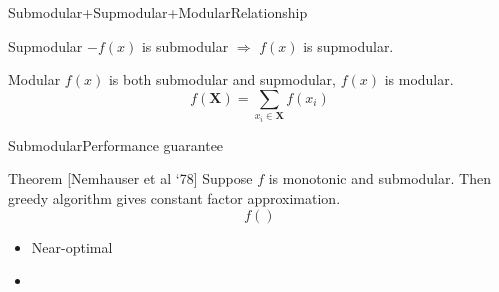 \begin{frame}{Submodular+Supmodular+Modular}{Relationship}
\begin{block}{Supmodular}
$ - f(x) $ is submodular $ \Rightarrow $ $ f(x) $ is supmodular.
\end{block}
\begin{block}{Modular}
$ f(x) $ is both submodular and supmodular, $ f(x) $ is modular.
\begin{equation}
\nonumber
f( \mathbf{X} ) = \sum_{ x_{i} \in \mathbf{X} } f(x_{i})
\end{equation}
\end{block}
\end{frame}

\begin{frame}{Submodular}{Performance guarantee}
\begin{block}{Theorem [Nemhauser et al `78]}
Suppose $ f $ is monotonic and submodular. 
Then greedy algorithm gives constant factor approximation.
\begin{equation}
\nonumber
f()
\end{equation}	
\end{block}
\begin{itemize}
\item Near-optimal
\item 
\end{itemize}
\end{frame}
